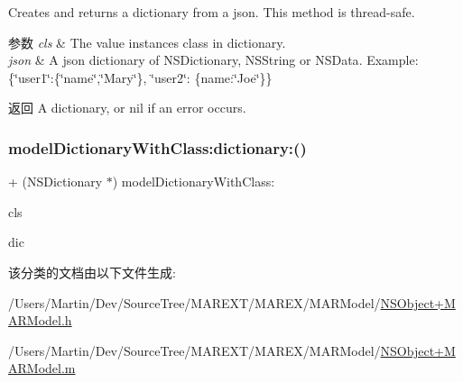 Creates and returns a dictionary from a json. This method is thread-\/safe.


\begin{DoxyParams}{参数}
{\em cls} & The value instance\textquotesingle{}s class in dictionary. \\
\hline
{\em json} & A json dictionary of {\ttfamily N\+S\+Dictionary}, {\ttfamily N\+S\+String} or {\ttfamily N\+S\+Data}. Example\+: \{\char`\"{}user1\char`\"{}\+:\{\char`\"{}name\char`\"{},\char`\"{}\+Mary\char`\"{}\}, \char`\"{}user2\char`\"{}\+: \{name\+:\char`\"{}\+Joe\char`\"{}\}\}\\
\hline
\end{DoxyParams}
\begin{DoxyReturn}{返回}
A dictionary, or nil if an error occurs. 
\end{DoxyReturn}
\mbox{\label{category_n_s_dictionary_07_m_a_r_model_08_ac8320efb4be700de3645e2710d4aa6a1}} 
\subsubsection{\texorpdfstring{model\+Dictionary\+With\+Class\+:dictionary\+:()}{modelDictionaryWithClass:dictionary:()}}
{\footnotesize\ttfamily + (N\+S\+Dictionary $\ast$) model\+Dictionary\+With\+Class\+: \begin{DoxyParamCaption}\item[{(Class)}]{cls }\item[{dictionary:(N\+S\+Dictionary $\ast$)}]{dic }\end{DoxyParamCaption}\hspace{0.3cm}{\ttfamily [implementation]}}



该分类的文档由以下文件生成\+:\begin{DoxyCompactItemize}
\item 
/\+Users/\+Martin/\+Dev/\+Source\+Tree/\+M\+A\+R\+E\+X\+T/\+M\+A\+R\+E\+X/\+M\+A\+R\+Model/\hyperlink{_n_s_object_09_m_a_r_model_8h}{N\+S\+Object+\+M\+A\+R\+Model.\+h}\item 
/\+Users/\+Martin/\+Dev/\+Source\+Tree/\+M\+A\+R\+E\+X\+T/\+M\+A\+R\+E\+X/\+M\+A\+R\+Model/\hyperlink{_n_s_object_09_m_a_r_model_8m}{N\+S\+Object+\+M\+A\+R\+Model.\+m}\end{DoxyCompactItemize}
